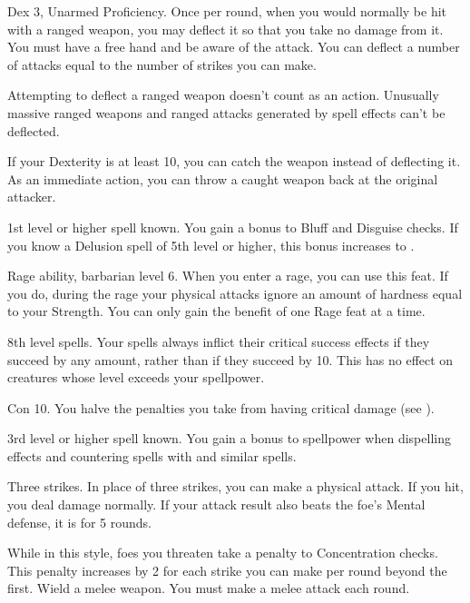 \featpres Dex 3, Unarmed Proficiency.
\featben Once per round, when you would normally be hit with a ranged weapon, you may deflect it so that you take no damage from it.
You must have a free hand and be aware of the attack.
You can deflect a number of attacks equal to the number of strikes you can make.
\par Attempting to deflect a ranged weapon doesn't count as an action.
Unusually massive ranged weapons and ranged attacks generated by spell effects can't be deflected.
\par If your Dexterity is at least 10, you can catch the weapon instead of deflecting it.
As an immediate action, you can throw a caught weapon back at the original attacker.

\featpre 1st level or higher  spell known.
\featben You gain a  bonus to Bluff and Disguise checks.
If you know a Delusion spell of 5th level or higher, this bonus increases to .

\featpres Rage ability, barbarian level 6.
\featben When you enter a rage, you can use this feat. If you do, during the rage your physical attacks ignore an amount of hardness equal to your Strength.
 You can only gain the benefit of one Rage feat at a time.

\featpre 8th level spells.
\featben Your spells always inflict their critical success effects if they succeed by any amount, rather than if they succeed by 10.
This has no effect on creatures whose level exceeds your spellpower.

\featpre Con 10.
\featben You halve the penalties you take from having critical damage (see ).

\featpre 3rd level or higher  spell known.
\featben You gain a  bonus to spellpower when dispelling effects and countering spells with  and similar spells.

\featpre Three strikes.
\featben In place of three strikes, you can make a physical attack.
If you hit, you deal damage normally.
If your attack result also beats the foe's Mental defense, it is \disoriented for 5 rounds.

\featben While in this style, foes you threaten take a  penalty to Concentration checks.
This penalty increases by 2 for each strike you can make per round beyond the first.
\stylereq Wield a melee weapon. You must make a melee attack each round.

